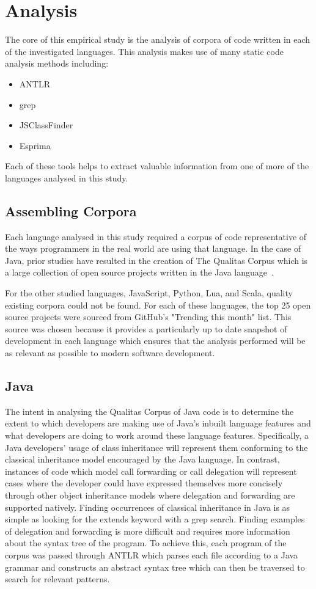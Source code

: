 \chapter{Analysis}\label{C:analysis} 
The core of this empirical study is the analysis of corpora of code written in each of the investigated languages. This analysis makes use of many static code analysis methods including:
\begin{itemize}
	\item ANTLR
	\item grep
	\item JSClassFinder
	\item Esprima
\end{itemize}
Each of these tools helps to extract valuable information from one of more of the languages analysed in this study.

\section{Assembling Corpora}
Each language analysed in this study required a corpus of code representative of the ways programmers in the real world are using that language. In the case of Java, prior studies have resulted in the creation of The Qualitas Corpus which is a large collection of open source projects written in the Java language~\cite{QualitasCorpus}. \newline

For the other studied languages, JavaScript, Python, Lua, and Scala, quality existing corpora could not be found. For each of these languages, the top 25 open source projects were sourced from GitHub's "Trending this month" list. This source was chosen because it provides a particularly up to date snapshot of development in each language which ensures that the analysis performed will be as relevant as possible to modern software development.

\section{Java}
The intent in analysing the Qualitas Corpus of Java code is to determine the extent to which developers are making use of Java's inbuilt language features and what developers are doing to work around these language features. Specifically, a Java developers' usage of class inheritance will represent them conforming to the classical inheritance model encouraged by the Java language. In contrast, instances of code which model call forwarding or call delegation will represent cases where the developer could have expressed themselves more concisely through other object inheritance models where delegation and forwarding are supported natively. \newline
Finding occurrences of classical inheritance in Java is as simple as looking for the extends keyword with a grep search. Finding examples of delegation and forwarding is more difficult and requires more information about the syntax tree of the program. To achieve this, each program of the corpus was passed through ANTLR which parses each file according to a Java grammar and constructs an abstract syntax tree which can then be traversed to search for relevant patterns.

